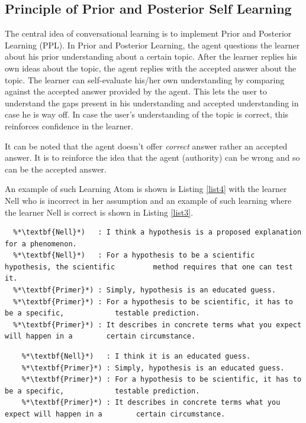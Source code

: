 \documentclass[]{article}
\begin{document}
\subsection[Prior and Posterior]{Principle of Prior and Posterior Self Learning} 


The central idea of conversational learning is to implement Prior and Posterior Learning (PPL). In Prior and Posterior Learning, the agent questions the learner about his prior understanding about a certain topic. After the learner replies his own ideas about the topic, the agent replies with the accepted answer about the topic. The learner can self-evaluate his/her own understanding by comparing against the accepted answer provided by the agent. This lets the user to understand the gaps present in his understanding and accepted understanding in case he is way off. In case the user's understanding of the topic is correct, this reinforces confidence in the learner. 


It can be noted that the agent doesn't offer \textit{correct} answer rather an accepted answer. It is to reinforce the idea that the agent (authority) can be wrong and so can be the accepted answer.  

An example of such Learning Atom is shown is Listing \ref{list4} with the learner Nell who is incorrect in her assumption and an example of such learning where the learner Nell is correct is shown in Listing \ref{list3}.

\begin{lstlisting}[frame=single,caption=Learning Atom with the user having correct assumption ,float,label=list3]
  %*\textbf{Primer}*) : Nell, what do you think is a hypothesis?
  %*\textbf{Nell}*)   : I think a hypothesis is a proposed explanation for a phenomenon. 
  %*\textbf{Nell}*)   : For a hypothesis to be a scientific hypothesis, the scientific         method requires that one can test it.
  %*\textbf{Primer}*) : Simply, hypothesis is an educated guess.
  %*\textbf{Primer}*) : For a hypothesis to be scientific, it has to be a specific,            testable prediction.
  %*\textbf{Primer}*) : It describes in concrete terms what you expect will happen in a        certain circumstance. 
  \end{lstlisting}

  \begin{lstlisting}[frame=single,caption=Learning Atom with the user having incorrect assumption ,float, label=list4]
    %*\textbf{Primer}*) : Nell, what do you think is a hypothesis?
    %*\textbf{Nell}*)   : I think it is an educated guess.
    %*\textbf{Primer}*) : Simply, hypothesis is an educated guess.
    %*\textbf{Primer}*) : For a hypothesis to be scientific, it has to be a specific,            testable prediction.
    %*\textbf{Primer}*) : It describes in concrete terms what you expect will happen in a        certain circumstance. 
    \end{lstlisting}
\end{document}
